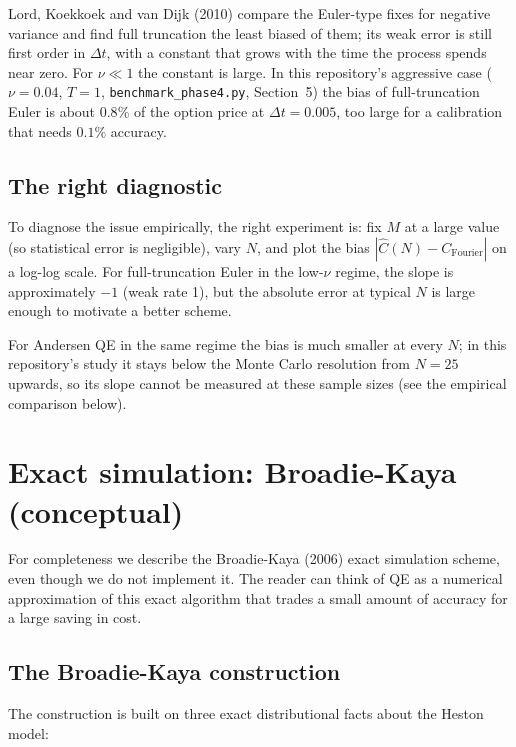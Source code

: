 \documentclass[11pt]{article}
\theoremstyle{plain}
\theoremstyle{definition}
\theoremstyle{remark}
\begin{document}
Lord, Koekkoek and van Dijk (2010) compare the Euler-type fixes for negative variance and find full truncation the least biased of them; its weak error is still first order in $\Delta t$, with a constant that grows with the time the process spends near zero. For $\nu \ll 1$ the constant is large. In this repository's aggressive case ($\nu = 0.04$, $T = 1$, \texttt{benchmark\_phase4.py}, Section~5) the bias of full-truncation Euler is about $0.8\%$ of the option price at $\Delta t = 0.005$, too large for a calibration that needs $0.1\%$ accuracy.

\subsection{The right diagnostic}

To diagnose the issue empirically, the right experiment is: fix $M$ at a large value (so statistical error is negligible), vary $N$, and plot the bias $|\widehat C(N) - C_{\mathrm{Fourier}}|$ on a log-log scale. For full-truncation Euler in the low-$\nu$ regime, the slope is approximately $-1$ (weak rate 1), but the absolute error at typical $N$ is large enough to motivate a better scheme.

For Andersen QE in the same regime the bias is much smaller at every $N$; in this repository's study it stays below the Monte Carlo resolution from $N = 25$ upwards, so its slope cannot be measured at these sample sizes (see the empirical comparison below).

\section{Exact simulation: Broadie-Kaya (conceptual)}

For completeness we describe the Broadie-Kaya (2006) exact simulation scheme, even though we do not implement it. The reader can think of QE as a numerical approximation of this exact algorithm that trades a small amount of accuracy for a large saving in cost.

\subsection{The Broadie-Kaya construction}

The construction is built on three exact distributional facts about the Heston model:
\end{document}
